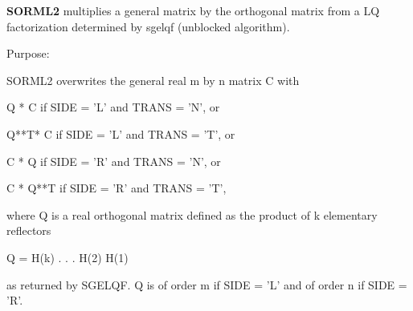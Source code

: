 {\bfseries S\+O\+R\+M\+L2} multiplies a general matrix by the orthogonal matrix from a L\+Q factorization determined by sgelqf (unblocked algorithm). 

 \begin{DoxyParagraph}{Purpose\+: }
\begin{DoxyVerb} SORML2 overwrites the general real m by n matrix C with

       Q * C  if SIDE = 'L' and TRANS = 'N', or

       Q**T* C  if SIDE = 'L' and TRANS = 'T', or

       C * Q  if SIDE = 'R' and TRANS = 'N', or

       C * Q**T if SIDE = 'R' and TRANS = 'T',

 where Q is a real orthogonal matrix defined as the product of k
 elementary reflectors

       Q = H(k) . . . H(2) H(1)

 as returned by SGELQF. Q is of order m if SIDE = 'L' and of order n
 if SIDE = 'R'.\end{DoxyVerb}
 
\end{DoxyParagraph}

